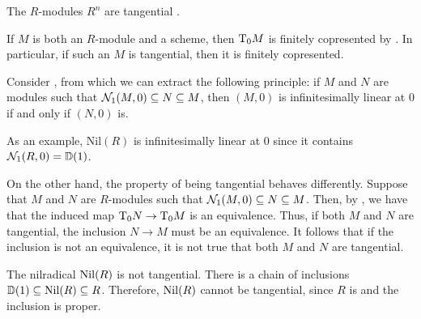 \begin{example}\label{ex:R-lin-flat}
  The $R$-modules $R^n$ are tangential \cite[Lemma 2.2.3]{diffgeo-article}.
\end{example}

\begin{remark}
  If $M$ is both an $R$-module and a scheme, then $\tangent{M}{0}$ is finitely copresented by \cite[Lemma 2.3.8]{diffgeo-article}.
  In particular, if such an $M$ is tangential, then it is finitely copresented.
\end{remark}

Consider , from which we can extract the following principle: if $M$ and $N$ are modules such that $\hood{M,0}{1} \subseteq N \subseteq M$, then $(M,0)$ is infinitesimally linear at $0$ if and only if $(N,0)$ is.

\begin{example}\label{ex:nil-inf-linear}
  As an example, $\mathrm{Nil}(R)$ is infinitesimally linear at $0$ since it contains $\hood{R,0}{1} = \D(1)$.
\end{example}

On the other hand, the property of being tangential behaves differently.
Suppose that $M$ and $N$ are $R$-modules such that $\hood{M,0}{1} \subseteq N \subseteq M$.
Then, by , we have that the induced map
$\tangent{N}{0} \to \tangent{M}{0}$ is an equivalence.
Thus, if both $M$ and $N$ are tangential, the inclusion $N \to M$ must be an equivalence.
It follows that if the inclusion is not an equivalence, it is not true that both $M$
and $N$ are tangential.

\begin{counterexample}\label{cex:nil-not-tangential}
  The nilradical $\Nil(R)$ is not tangential.
  There is a chain of inclusions $\D(1) \subseteq \Nil(R) \subseteq R$.
  Therefore, $\Nil(R)$ cannot be tangential, since $R$ is and the inclusion is proper.
\end{counterexample}


